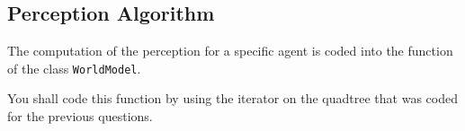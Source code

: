 \documentclass[article,english,nodocumentinfo]{multiagentfrreport}
\begin{document}
\subsection{Perception Algorithm}

The computation of the perception for a specific agent is coded into the function  of the class \texttt{WorldModel}.

You shall code this function by using the iterator on the quadtree that was coded for the previous questions.
\end{document}
